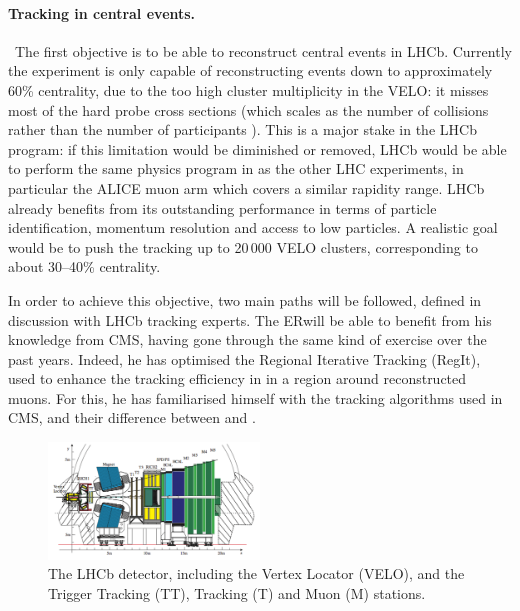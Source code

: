 \documentclass[a4paper,11pt]{article}
\newcommand{\ER}{ER}
\begin{document}
\paragraph{Tracking in central \pbpb events. }\ 
The first objective is to be able to reconstruct central events in LHCb. Currently the experiment is only capable of reconstructing events down to approximately 60\% centrality, due to the too high cluster multiplicity in the VELO: it misses most of the hard probe cross sections (which scales as the number of collisions \ncoll rather than the number of participants \npart). This is a major stake in the LHCb \pbpb program: if this limitation would be diminished or removed, LHCb would be able to perform the same physics program in \pbpb as the other LHC experiments, in particular the ALICE muon arm which covers a similar rapidity range. LHCb already benefits from its outstanding performance in terms of particle identification, momentum resolution and access to low \pt particles. A realistic goal would be to push the tracking up to 20\,000 VELO clusters, corresponding to about 30--40\% centrality.

In order to achieve this objective, two main paths will be followed, defined in discussion with LHCb tracking experts. The \ER will be able to benefit from his knowledge from CMS, having gone through the same kind of exercise over the past years. Indeed, he has optimised the Regional Iterative Tracking (RegIt), used to enhance the tracking efficiency in \pbpb in a region around reconstructed muons. For this, he has familiarised himself with the tracking algorithms used in CMS, and their difference between \pp and \pbpb.

\begin{figure}
  \begin{center}
    \includegraphics[width=0.5\textwidth]{plots/lhcblayout.png}
  \end{center}
  \caption{The LHCb detector, including the Vertex Locator (VELO), and the Trigger Tracking (TT), Tracking (T) and Muon (M) stations. \label{fig:lhcb}}
\end{figure}
\end{document}
